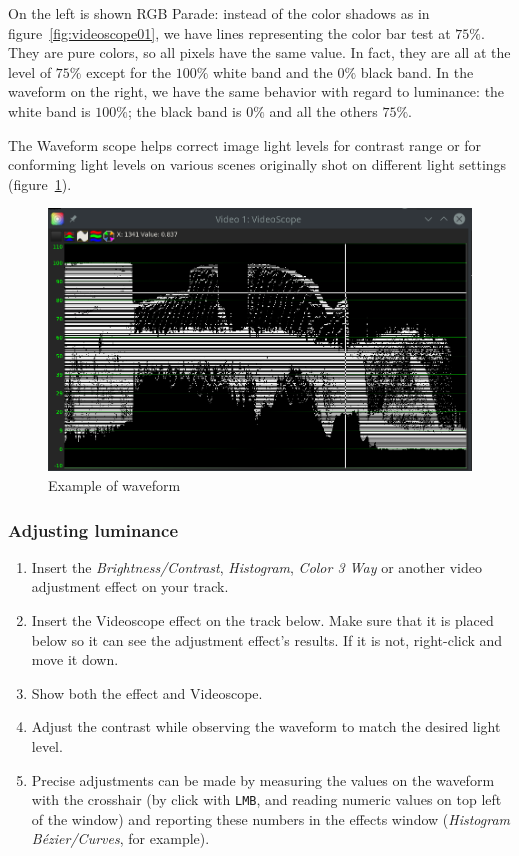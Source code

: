 On the left is shown RGB Parade: instead of the color shadows as in figure~\ref{fig:videoscope01}, we have lines representing the color bar test at $75\%$. They are pure colors, so all pixels have the same value. In fact, they are all at the level of $75\%$ except for the $100\%$ white band and the $0\%$ black band. In the waveform on the right, we have the same behavior with regard to luminance: the white band is $100\%$; the black band is $0\%$ and all the others $75\%$.

The Waveform scope helps correct image light levels for contrast range or for conforming light levels on various scenes originally shot on different light settings (figure~\ref{fig:videoscope03}).

\begin{figure}[hbtp]
    \centering
    \includegraphics[width=0.7\linewidth]{images/videoscope03.png}
    \caption{Example of waveform}
    \label{fig:videoscope03}
\end{figure}

\subsubsection*{Adjusting luminance}%
\label{ssub:adjusting_luminance}

\begin{enumerate}
    \item Insert the \textit{Brightness/Contrast}, \textit{Histogram}, \textit{Color 3 Way} or another video adjustment effect on your track.
    \item Insert the Videoscope effect on the track below. Make sure that it is placed below so it can see the adjustment effect's results. If it is not, right-click and move it down.
    \item Show both the effect and Videoscope.
    \item Adjust the contrast while observing the waveform to match the desired light level.
    \item Precise adjustments can be made by measuring the values on the waveform with the crosshair (by click with \texttt{LMB}, and reading numeric values on top left of the window) and reporting these numbers in the effects window (\textit{Histogram Bézier/Curves}, for example).
\end{enumerate}

